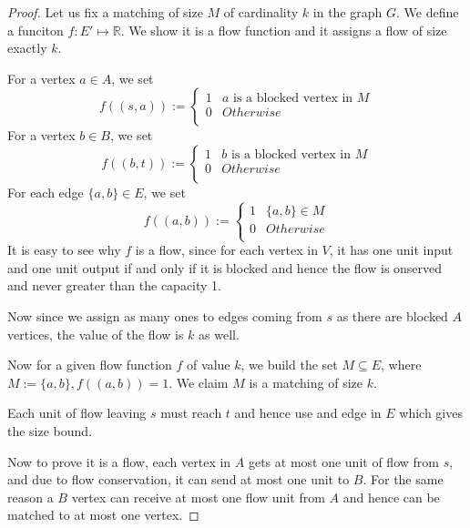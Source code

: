 \begin{proof}
	Let us fix a matching of size $M$ of cardinality $k$ in the graph $G$. We define a funciton $f:E'\mapsto \mathbb{R}$. We show it is a flow function and it assigns a flow of size exactly $k$.  	

	For a vertex $a \in A$, we set
	\begin{equation*}
		f((s, a)) :=
		\begin{cases}
			1& a \text{ is a blocked vertex in } M\\
			0& Otherwise\\
		\end{cases}
	\end{equation*}
	For a vertex $b \in B$, we set
	\begin{equation*}
		f((b, t)) :=
		\begin{cases}
			1& b \text{ is a blocked vertex in } M\\
			0& Otherwise\\
		\end{cases}
	\end{equation*}
	For each edge $\{a, b\} \in E$, we set
	\begin{equation*}
		f((a, b)) :=
		\begin{cases}
			1& \{a, b\} \in M\\
			0& Otherwise\\
		\end{cases}
	\end{equation*}
	It is easy to see why $f$ is a flow, since for each vertex in $V$, it has one unit input and one unit output if and only if it is blocked and hence the flow is onserved and never greater than the capacity 1.

	Now since we assign as many ones to edges coming from $s$ as there are blocked $A$ vertices, the value of the flow is $k$ as well.

	Now for a given flow function $f$ of value $k$, we build the set $M \subseteq E$, where $M := \{a, b\}, f((a,b)) = 1$. We claim $M$ is a matching of size $k$.

	Each unit of flow leaving $s$ must reach $t$ and hence use and edge in $E$ which gives the size bound.

	Now to prove it is a flow, each vertex in $A$ gets at most one unit of flow from $s$, and due to flow conservation, it can send at most one unit to $B$. For the same reason a $B$ vertex can receive at most one flow unit from $A$ and hence can be matched to at most one vertex.
\end{proof}

